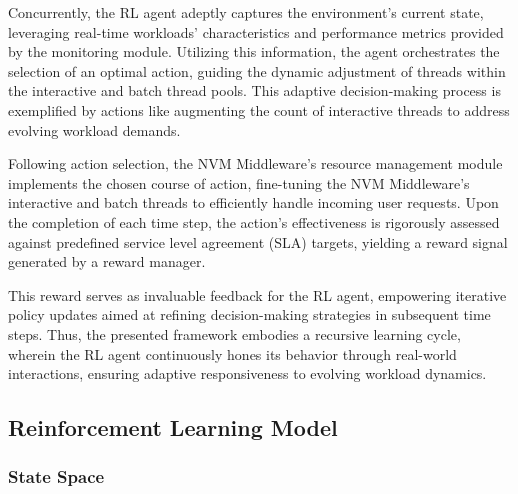 Concurrently, the RL agent adeptly captures the environment's current state, leveraging real-time workloads' characteristics and performance metrics provided by the monitoring module. Utilizing this information, the agent orchestrates the selection of an optimal action, guiding the dynamic adjustment of threads within the interactive and batch thread pools. This adaptive decision-making process is exemplified by actions like augmenting the count of interactive threads to address evolving workload demands.

Following action selection, the NVM Middleware's resource management module implements the chosen course of action, fine-tuning the NVM Middleware's interactive and batch threads to efficiently handle incoming user requests. Upon the completion of each time step, the action's effectiveness is rigorously assessed against predefined service level agreement (SLA) targets, yielding a reward signal generated by a reward manager.

This reward serves as invaluable feedback for the RL agent, empowering iterative policy updates aimed at refining decision-making strategies in subsequent time steps. Thus, the presented framework embodies a recursive learning cycle, wherein the RL agent continuously hones its behavior through real-world interactions, ensuring adaptive responsiveness to evolving workload dynamics.

\subsection{Reinforcement Learning Model}

\subsubsection{State Space}

